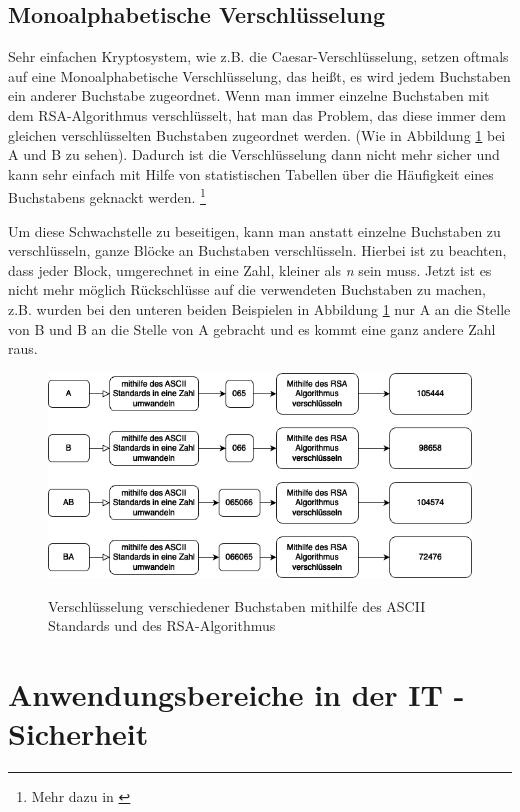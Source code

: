 \documentclass[12pt,a4paper]{scrartcl}
\begin{document}
	\subsection{Monoalphabetische Verschlüsselung}
	\label{cha:mono_enc}
	Sehr einfachen Kryptosystem, wie z.B. die Caesar-Verschlüsselung, setzen oftmals auf eine Monoalphabetische Verschlüsselung, das heißt, es wird jedem Buchstaben ein anderer Buchstabe zugeordnet. Wenn man immer einzelne Buchstaben mit dem RSA-Algorithmus verschlüsselt, hat man das Problem, das diese immer dem gleichen verschlüsselten Buchstaben zugeordnet werden. (Wie in Abbildung \ref{fig:figure4} bei A und B zu sehen). Dadurch ist die Verschlüsselung dann nicht mehr sicher und kann sehr einfach mit Hilfe von statistischen Tabellen über die Häufigkeit eines Buchstabens geknackt werden. \footnote{Mehr dazu in \cite{mono}}
	
	Um diese Schwachstelle zu beseitigen, kann man anstatt einzelne Buchstaben zu verschlüsseln, ganze Blöcke an Buchstaben verschlüsseln. Hierbei ist zu beachten, dass jeder Block, umgerechnet in eine Zahl, kleiner als \textit{n} sein muss. Jetzt ist es nicht mehr möglich Rückschlüsse auf die verwendeten Buchstaben zu machen, z.B. wurden bei den unteren beiden Beispielen in Abbildung \ref{fig:figure4} nur A an die Stelle von B und B an die Stelle von A gebracht und es kommt eine ganz andere Zahl raus.


\begin{figure}		
\includegraphics[scale=0.6]{rsa_mono} \\
\caption{Verschlüsselung verschiedener Buchstaben mithilfe des ASCII Standards und des RSA-Algorithmus}
\label{fig:figure4}
\end{figure}
	
\pagebreak

\section{Anwendungsbereiche in der IT - Sicherheit}
\end{document}
